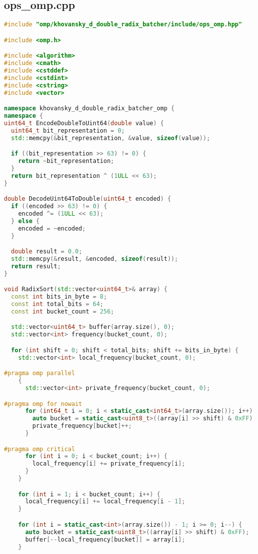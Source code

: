 \documentclass[12pt]{article}
\begin{document}
\subsection*{ops\_omp.cpp}
\begin{lstlisting}[language=C++,
    breaklines=true,       % Автоматический перенос строк
    columns=fullflexible ]
#include "omp/khovansky_d_double_radix_batcher/include/ops_omp.hpp"

#include <omp.h>

#include <algorithm>
#include <cmath>
#include <cstddef>
#include <cstdint>
#include <cstring>
#include <vector>

namespace khovansky_d_double_radix_batcher_omp {
namespace {
uint64_t EncodeDoubleToUint64(double value) {
  uint64_t bit_representation = 0;
  std::memcpy(&bit_representation, &value, sizeof(value));

  if ((bit_representation >> 63) != 0) {
    return ~bit_representation;
  }
  return bit_representation ^ (1ULL << 63);
}

double DecodeUint64ToDouble(uint64_t encoded) {
  if ((encoded >> 63) != 0) {
    encoded ^= (1ULL << 63);
  } else {
    encoded = ~encoded;
  }

  double result = 0.0;
  std::memcpy(&result, &encoded, sizeof(result));
  return result;
}

void RadixSort(std::vector<uint64_t>& array) {
  const int bits_in_byte = 8;
  const int total_bits = 64;
  const int bucket_count = 256;

  std::vector<uint64_t> buffer(array.size(), 0);
  std::vector<int> frequency(bucket_count, 0);

  for (int shift = 0; shift < total_bits; shift += bits_in_byte) {
    std::vector<int> local_frequency(bucket_count, 0);

#pragma omp parallel
    {
      std::vector<int> private_frequency(bucket_count, 0);

#pragma omp for nowait
      for (int64_t i = 0; i < static_cast<int64_t>(array.size()); i++) {
        auto bucket = static_cast<uint8_t>((array[i] >> shift) & 0xFF);
        private_frequency[bucket]++;
      }

#pragma omp critical
      for (int i = 0; i < bucket_count; i++) {
        local_frequency[i] += private_frequency[i];
      }
    }

    for (int i = 1; i < bucket_count; i++) {
      local_frequency[i] += local_frequency[i - 1];
    }

    for (int i = static_cast<int>(array.size()) - 1; i >= 0; i--) {
      auto bucket = static_cast<uint8_t>((array[i] >> shift) & 0xFF);
      buffer[--local_frequency[bucket]] = array[i];
    }


\end{lstlisting}
\end{document}

